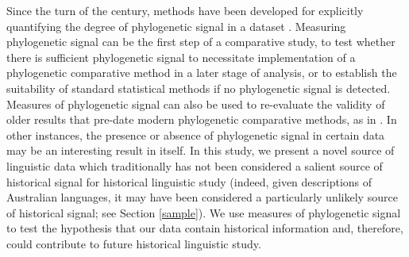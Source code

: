 Since the turn of the century, methods have been developed for explicitly quantifying the degree of phylogenetic signal in a dataset \autocite[p.~591]{revell_phylogenetic_2008}. Measuring phylogenetic signal can be the first step of a comparative study, to test whether there is sufficient phylogenetic signal to necessitate implementation of a phylogenetic comparative method in a later stage of analysis, or to establish the suitability of standard statistical methods if no phylogenetic signal is detected. Measures of phylogenetic signal can also be used to re-evaluate the validity of older results that pre-date modern phylogenetic comparative methods, as in \textcite{freckleton_phylogenetic_2002}. In other instances, the presence or absence of phylogenetic signal in certain data may be an interesting result in itself. In this study, we present a novel source of linguistic data which traditionally has not been considered a salient source of historical signal for historical linguistic study (indeed, given descriptions of Australian languages, it may have been considered a particularly unlikely source of historical signal; see Section \ref{sample}). We use measures of phylogenetic signal to test the hypothesis that our data contain historical information and, therefore, could contribute to future historical linguistic study.


